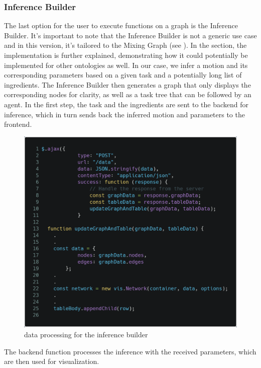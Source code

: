 \subsubsection*{Inference Builder}
The last option for the user to execute functions on a graph is the Inference Builder. 
It's important to note that the Inference Builder is not a generic use case and in this version, it's tailored to the Mixing Graph (see ). 
In the  section, the implementation is further explained, demonstrating how it could potentially be implemented for other ontologies as well. 
In our case, we infer a motion and its corresponding parameters based on a given task and a potentially long list of ingredients. 
The Inference Builder then generates a graph that only displays the corresponding nodes for clarity, as well as a task tree that can be followed by an agent.
In the first step, the task and the ingredients are sent to the backend for inference, which in turn sends back the inferred motion and parameters to the frontend.

\begin{figure}[H]
    \includegraphics[scale=0.25]{Graphics/inference_builder_js.png}
    \caption{data processing for the inference builder}
\end{figure}

The backend function processes the inference with the received parameters, which are then used for visualization.

